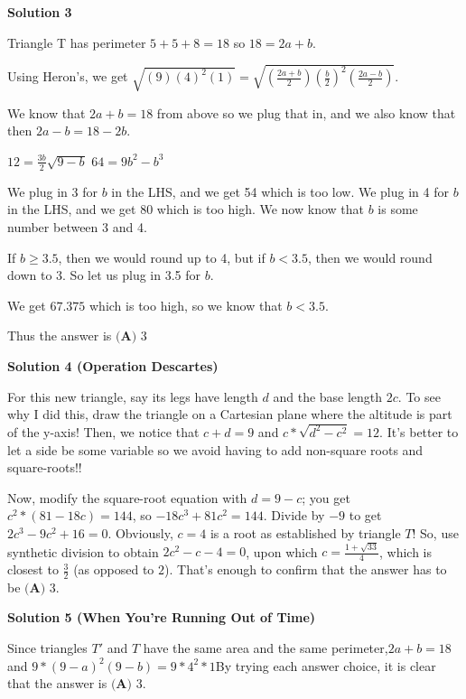 \begin{enumerate}
 



\textbf{Solution 3}

Triangle T has perimeter $5 + 5 + 8 = 18$ so $18 = 2a + b$.

 Using Heron's, we get $\sqrt{(9)(4)^2(1)} = \sqrt{(\frac{2a+b}{2})\left(\frac{b}{2}\right)^2(\frac{2a-b}{2})}$.

 We know that $2a + b = 18$ from above so we plug that in, and we also know that then $2a - b = 18 - 2b$.

 $12 = \frac{3b}{2}\sqrt{9-b}$
$64 = 9b^2 - b^3$

 We plug in 3 for $b$ in the LHS, and we get 54 which is too low. We plug in 4 for $b$ in the LHS, and we get 80 which is too high. We now know that $b$ is some number between 3 and 4. 

 If $b \geq 3.5$, then we would round up to 4, but if $b < 3.5$, then we would round down to 3. So let us plug in 3.5 for $b$. 

 We get $67.375$ which is too high, so we know that $b < 3.5$.

 Thus the answer is $\boxed{\textbf{(A) }3}$




\textbf{Solution 4 (Operation Descartes)}

For this new triangle, say its legs have length $d$ and the base length $2c$. To see why I did this, draw the triangle on a Cartesian plane where the altitude is part of the y-axis! Then, we notice that $c+d=9$ and $c*\sqrt{d^2-c^2}=12$. It's better to let a side be some variable so we avoid having to add non-square roots and square-roots!!

 Now, modify the square-root equation with $d=9-c$; you get $c^2*(81-18c)=144$, so $-18c^3+81c^2=144$. Divide by $-9$ to get $2c^3-9c^2+16=0$. Obviously, $c=4$ is a root as established by triangle $T$! So, use synthetic division to obtain $2c^2-c-4=0$, upon which $c=\frac{1+\sqrt{33}}{4}$, which is closest to $\frac{3}{2}$ (as opposed to $2$). That's enough to confirm that the answer has to be $\boxed{\textbf{(A) }3}$.

 



\textbf{Solution 5 (When You're Running Out of Time)}

Since triangles $T'$ and $T$ have the same area and the same perimeter,$2a+b=18$ and $9*(9-a)^2(9-b) = 9*4^2*1$By trying each answer choice, it is clear that the answer is $\boxed{\textbf{(A) }3}$.


\end{enumerate}
